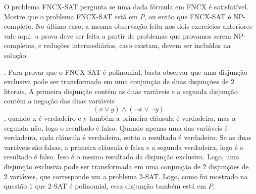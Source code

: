 \documentclass[12pt]{article}
\newcommand{\resposta}[1]{ \noindent {\bf Solução}.{\color{blue} #1}}
\begin{document}
\begin{enumerate}
  O problema FNCX-SAT pergunta se uma dada fórmula em FNCX é
  satisfatível. Mostre que o problema FNCX-SAT está em $P$, ou então
  que FNCX-SAT é NP-completo. No último caso, a mesma observação feita
  nos dois exercícios anteriores vale aqui: a prova deve ser feita a
  partir de problemas que provamos serem NP-completos, e reduções
  intermediárias, caso existam, devem ser incluídas na solução.

  \resposta{
    Para provar que o FNCX-SAT é polinomial, basta observar que uma disjunção exclusiva pode ser transformado em uma conjunção de duas disjunções de 2 literais. A primeira disjunção contém as duas variáveis e a segunda disjunção contém a negação das duas variáveis $$(x\lor y)\land (\neg x \lor \neg y)$$, quando x é verdadeiro e y também a primeira cláusula é verdadeira, mas a segunda não, logo o resultado é falso. Quando apenas uma das variáveis é verdadeira, cada cláusula é verdadeira, então o resultado é verdadeiro. Se as duas variáveis são falsas, a primeira cláusula é falsa e a segunda verdadeira, logo é o resultado é falso. Isso é o mesmo resultado da disjunção exclusiva. Logo, uma disjunção exclusiva pode ser transformada em uma conjunção de 2 disjunções de 2 variáveis, que corresponde um a problema 2-SAT. Logo, como foi mostrado na questão 1 que 2-SAT é polinomial, essa disjunção também está em $P$.
  }
\end{enumerate}
\end{document}
